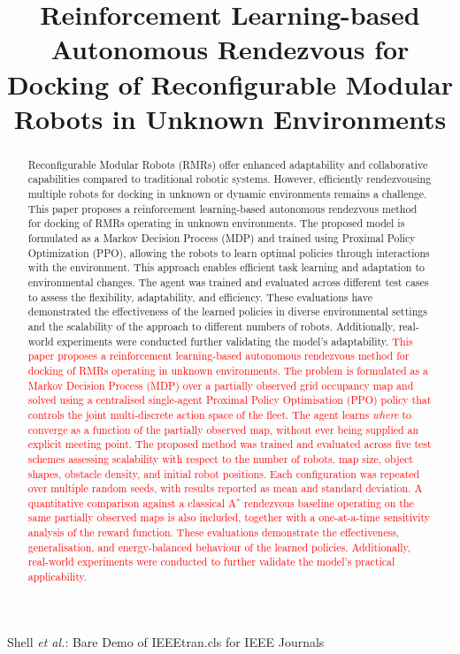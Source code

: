 \documentclass[journal]{IEEEtran}
\begin{document}
\title{
Reinforcement Learning-based Autonomous Rendezvous for Docking of Reconfigurable Modular Robots in Unknown Environments
}

%
{Shell \MakeLowercase{\textit{et al.}}: Bare Demo of IEEEtran.cls for IEEE Journals}

\maketitle

\begin{abstract}

Reconfigurable Modular Robots (RMRs) offer enhanced adaptability and collaborative capabilities compared to traditional robotic systems. However, efficiently rendezvousing multiple robots for docking in unknown or dynamic environments remains a challenge.
\textcolor{green!60!black}{This paper proposes a reinforcement learning-based autonomous rendezvous method for docking of RMRs operating in unknown environments. The proposed model is formulated as a Markov Decision Process (MDP) and trained using Proximal Policy Optimization (PPO), allowing the robots to learn optimal policies through interactions with the environment. This approach enables efficient task learning and adaptation to environmental changes. The agent was trained and evaluated across different test cases to assess the flexibility, adaptability, and efficiency. These evaluations have demonstrated the effectiveness of the learned policies in diverse environmental settings and the scalability of the approach to different numbers of robots. Additionally, real-world experiments were conducted further validating the model's adaptability.}
\textcolor{red}{This paper proposes a reinforcement learning-based autonomous rendezvous method for docking of RMRs operating in unknown environments. The problem is formulated as a Markov Decision Process (MDP) over a partially observed grid occupancy map and solved using a centralised single-agent Proximal Policy Optimisation (PPO) policy that controls the joint multi-discrete action space of the fleet. The agent learns \emph{where} to converge as a function of the partially observed map, without ever being supplied an explicit meeting point. The proposed method was trained and evaluated across five test schemes assessing scalability with respect to the number of robots, map size, object shapes, obstacle density, and initial robot positions. Each configuration was repeated over multiple random seeds, with results reported as mean and standard deviation. A quantitative comparison against a classical A$^{*}$ rendezvous baseline operating on the same partially observed maps is also included, together with a one-at-a-time sensitivity analysis of the reward function. These evaluations demonstrate the effectiveness, generalisation, and energy-balanced behaviour of the learned policies. Additionally, real-world experiments were conducted to further validate the model's practical applicability.}


\end{abstract}
\end{document}
